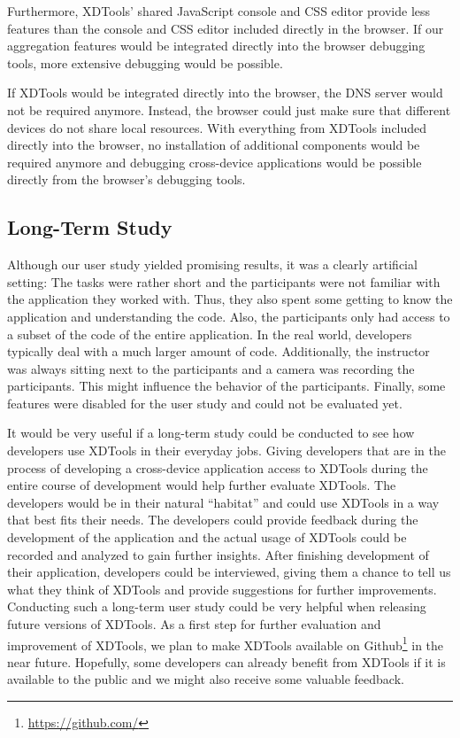 Furthermore, XDTools' shared JavaScript console and CSS editor provide less features than the console and CSS editor included directly in the browser. If our aggregation features would be integrated directly into the browser debugging tools, more extensive debugging would be possible.

If XDTools would be integrated directly into the browser, the DNS server would not be required anymore. Instead, the browser could just make sure that different devices do not share local resources. With everything from XDTools included directly into the browser, no installation of additional components would be required anymore and debugging cross-device applications would be possible directly from the browser's debugging tools.

\subsection{Long-Term Study}

Although our user study yielded promising results, it was a clearly artificial setting: The tasks were rather short and the participants were not familiar with the application they worked with. Thus, they also spent some getting to know the application and understanding the code. Also, the participants only had access to a subset of the code of the entire application. In the real world, developers typically deal with a much larger amount of code. Additionally, the instructor was always sitting next to the participants and a camera was recording the participants. This might influence the behavior of the participants. Finally, some features were disabled for the user study and could not be evaluated yet.

It would be very useful if a long-term study could be conducted to see how developers use XDTools in their everyday jobs. Giving developers that are in the process of developing a cross-device application access to XDTools during the entire course of development would help further evaluate XDTools. The developers would be in their natural ``habitat'' and could use XDTools in a way that best fits their needs. The developers could provide feedback during the development of the application and the actual usage of XDTools could be recorded and analyzed to gain further insights. After finishing development of their application, developers could be interviewed, giving them a chance to tell us what they think of XDTools and provide suggestions for further improvements. Conducting such a long-term user study could be very helpful when releasing future versions of XDTools. As a first step for further evaluation and improvement of XDTools, we plan to make XDTools available on Github\footnote{\url{https://github.com/}} in the near future. Hopefully, some developers can already benefit from XDTools if it is available to the public and we might also receive some valuable feedback.